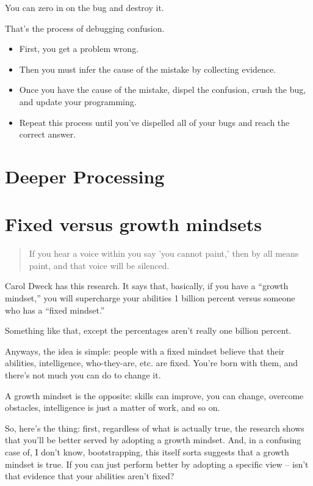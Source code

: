 You can zero in on the bug and destroy it.

That's the process of debugging confusion.

\begin{itemize}
\item First, you get a problem wrong.
\item Then you must infer the cause of the mistake by collecting evidence.
\item Once you have the cause of the mistake, dispel the confusion, crush the bug,
  and update your programming.
\item Repeat this process until you've dispelled all of your bugs and reach the
  correct answer.
\end{itemize}

\section{Deeper Processing}

\section{Fixed versus growth mindsets}

\begin{quote}
  If you hear a voice within you say 'you cannot paint,' then by all means
  paint, and that voice will be silenced.
\end{quote}

Carol Dweck has this research. It says that, basically, if you have a ``growth
mindset,'' you will supercharge your abilities 1 billion percent versus someone
who has a ``fixed mindset.''

Something like that, except the percentages aren't really one billion percent.

Anyways, the idea is simple: people with a fixed mindset believe that their
abilities, intelligence, who-they-are, etc. are fixed. You're born with them,
and there's not much you can do to change it.

A growth mindset is the opposite: skills can improve, you can change, overcome
obstacles, intelligence is just a matter of work, and so on.

So, here's the thing: first, regardless of what is actually true, the research
shows that you'll be better served by adopting a growth mindset. And, in a
confusing case of, I don't know, bootstrapping, this itself sorta suggests that
a growth mindset is true. If you can just perform better by adopting a specific
view -- isn't that evidence that your abilities aren't fixed?

